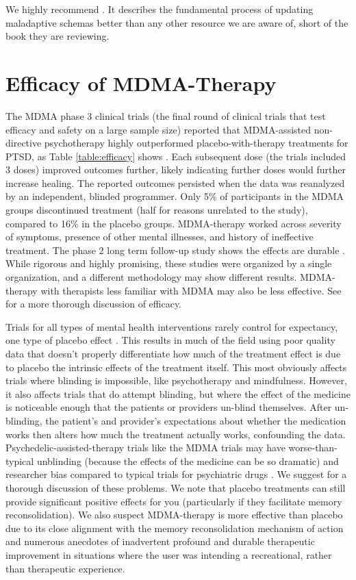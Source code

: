 \documentclass[12pt,letterpaper]{book}
\begin{document}
We highly recommend \textcite{lesswrongCoherenceTherapy}. It describes the fundamental process of updating maladaptive schemas better than any other resource we are aware of, short of the book they are reviewing.

\section{Efficacy of MDMA-Therapy}
The MDMA phase 3 clinical trials (the final round of clinical trials that test efficacy and safety on a large sample size) reported that MDMA-assisted non-directive psychotherapy highly outperformed placebo-with-therapy treatments for PTSD, as Table \ref{table:efficacy} shows \cite{mitchellMDMAClinicalTrial,mitchellMDMAClinicalTrial2}. Each subsequent dose (the trials included 3 doses) improved outcomes further, likely indicating further doses would further increase healing. The reported outcomes persisted when the data was reanalyzed by an independent, blinded programmer. Only 5\% of participants in the MDMA groups discontinued treatment (half for reasons unrelated to the study), compared to 16\% in the placebo groups. MDMA-therapy worked across severity of symptoms, presence of other mental illnesses, and history of ineffective treatment. The phase 2 long term follow-up study shows the effects are durable \cite{jeromeMDMALongTerm}. While rigorous and highly promising, these studies were organized by a single organization, and a different methodology may show different results. MDMA-therapy with therapists less familiar with MDMA may also be less effective. See \textcite{wolfgang2025} for a more thorough discussion of efficacy.

Trials for all types of mental health interventions rarely control for expectancy, one type of placebo effect \cite{hunekeExpectancy}. This results in much of the field using poor quality data that doesn't properly differentiate how much of the treatment effect is due to placebo the intrinsic effects of the treatment itself. This most obviously affects trials where blinding is impossible, like psychotherapy and mindfulness. However, it also affects trials that do attempt blinding, but where the effect of the medicine is noticeable enough that the patients or providers un-blind themselves. After un-blinding, the patient's and provider's expectations about whether the medication works then alters how much the treatment actually works, confounding the data. Psychedelic-assisted-therapy trials like the MDMA trials may have worse-than-typical unblinding (because the effects of the medicine can be so dramatic) and researcher bias compared to typical trials for psychiatric drugs \cite{adayMethodologicalRigor}. We suggest \textcite{vanElkMethodology} for a thorough discussion of these problems. We note that placebo treatments can still provide significant positive effects for you (particularly if they facilitate memory reconsolidation). We also suspect MDMA-therapy is more effective than placebo due to its close alignment with the memory reconsolidation mechanism of action and numerous anecdotes of inadvertent profound and durable therapeutic improvement in situations where the user was intending a recreational, rather than therapeutic experience.
\end{document}
